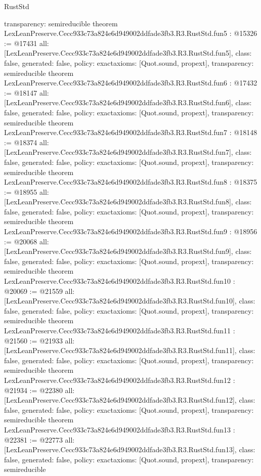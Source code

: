 \begin{lexlean}{RustStd}
\begin{coremodule}
{  transparency: semireducible
}
theorem LexLeanPreserve.Cecc933c73a824e6d949002ddfade3fb3.R3.RustStd.fun5 : @15326 := @17431 {
  all: [LexLeanPreserve.Cecc933c73a824e6d949002ddfade3fb3.R3.RustStd.fun5],
  class: false,
  generated: false,
  policy: exact{axioms: [Quot.sound, propext]},
  transparency: semireducible
}
theorem LexLeanPreserve.Cecc933c73a824e6d949002ddfade3fb3.R3.RustStd.fun6 : @17432 := @18147 {
  all: [LexLeanPreserve.Cecc933c73a824e6d949002ddfade3fb3.R3.RustStd.fun6],
  class: false,
  generated: false,
  policy: exact{axioms: [Quot.sound, propext]},
  transparency: semireducible
}
theorem LexLeanPreserve.Cecc933c73a824e6d949002ddfade3fb3.R3.RustStd.fun7 : @18148 := @18374 {
  all: [LexLeanPreserve.Cecc933c73a824e6d949002ddfade3fb3.R3.RustStd.fun7],
  class: false,
  generated: false,
  policy: exact{axioms: [Quot.sound, propext]},
  transparency: semireducible
}
theorem LexLeanPreserve.Cecc933c73a824e6d949002ddfade3fb3.R3.RustStd.fun8 : @18375 := @18955 {
  all: [LexLeanPreserve.Cecc933c73a824e6d949002ddfade3fb3.R3.RustStd.fun8],
  class: false,
  generated: false,
  policy: exact{axioms: [Quot.sound, propext]},
  transparency: semireducible
}
theorem LexLeanPreserve.Cecc933c73a824e6d949002ddfade3fb3.R3.RustStd.fun9 : @18956 := @20068 {
  all: [LexLeanPreserve.Cecc933c73a824e6d949002ddfade3fb3.R3.RustStd.fun9],
  class: false,
  generated: false,
  policy: exact{axioms: [Quot.sound, propext]},
  transparency: semireducible
}
theorem LexLeanPreserve.Cecc933c73a824e6d949002ddfade3fb3.R3.RustStd.fun10 : @20069 := @21559 {
  all: [LexLeanPreserve.Cecc933c73a824e6d949002ddfade3fb3.R3.RustStd.fun10],
  class: false,
  generated: false,
  policy: exact{axioms: [Quot.sound, propext]},
  transparency: semireducible
}
theorem LexLeanPreserve.Cecc933c73a824e6d949002ddfade3fb3.R3.RustStd.fun11 : @21560 := @21933 {
  all: [LexLeanPreserve.Cecc933c73a824e6d949002ddfade3fb3.R3.RustStd.fun11],
  class: false,
  generated: false,
  policy: exact{axioms: [Quot.sound, propext]},
  transparency: semireducible
}
theorem LexLeanPreserve.Cecc933c73a824e6d949002ddfade3fb3.R3.RustStd.fun12 : @21934 := @22380 {
  all: [LexLeanPreserve.Cecc933c73a824e6d949002ddfade3fb3.R3.RustStd.fun12],
  class: false,
  generated: false,
  policy: exact{axioms: [Quot.sound, propext]},
  transparency: semireducible
}
theorem LexLeanPreserve.Cecc933c73a824e6d949002ddfade3fb3.R3.RustStd.fun13 : @22381 := @22773 {
  all: [LexLeanPreserve.Cecc933c73a824e6d949002ddfade3fb3.R3.RustStd.fun13],
  class: false,
  generated: false,
  policy: exact{axioms: [Quot.sound, propext]},
  transparency: semireducible
}
\end{coremodule}
\end{lexlean}
